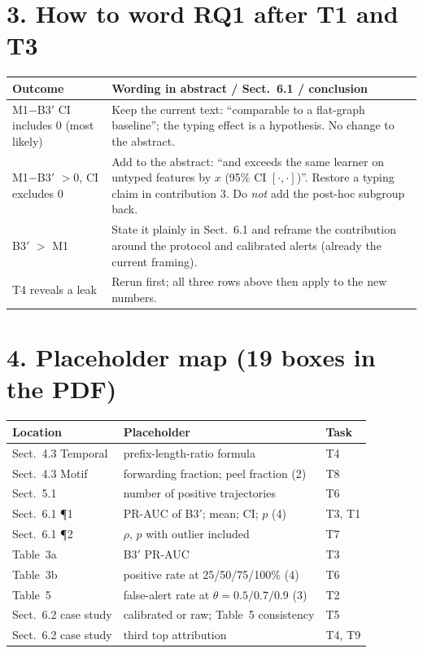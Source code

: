 \documentclass[11pt,a4paper]{article}
\begin{document}
\section*{3. How to word RQ1 after T1 and T3}
\begin{center}\small
\begin{tabular}{@{}p{6.2cm}p{9.6cm}@{}}
\toprule
Outcome & Wording in abstract / Sect.~6.1 / conclusion \\
\midrule
M1$-$B3$'$ CI includes 0 (most likely) & Keep the current text: ``comparable to a flat-graph baseline''; the typing effect is a hypothesis. No change to the abstract. \\
M1$-$B3$'$ $>0$, CI excludes 0 & Add to the abstract: ``and exceeds the same learner on untyped features by $x$ (95\% CI $[\cdot,\cdot]$)''. Restore a typing claim in contribution 3. Do \emph{not} add the post-hoc subgroup back. \\
B3$'$ $>$ M1 & State it plainly in Sect.~6.1 and reframe the contribution around the protocol and calibrated alerts (already the current framing). \\
T4 reveals a leak & Rerun first; all three rows above then apply to the new numbers. \\
\bottomrule
\end{tabular}
\end{center}

\section*{4. Placeholder map (19 boxes in the PDF)}
\begin{center}\small
\begin{tabular}{@{}lll@{}}
\toprule
Location & Placeholder & Task \\
\midrule
Sect.~4.3 Temporal & prefix-length-ratio formula & T4 \\
Sect.~4.3 Motif & forwarding fraction; peel fraction (2) & T8 \\
Sect.~5.1 & number of positive trajectories & T6 \\
Sect.~6.1 ¶1 & PR-AUC of B3$'$; mean; CI; $p$ (4) & T3, T1 \\
Sect.~6.1 ¶2 & $\rho$, $p$ with outlier included & T7 \\
Table~3a & B3$'$ PR-AUC & T3 \\
Table~3b & positive rate at 25/50/75/100\% (4) & T6 \\
Table~5 & false-alert rate at $\theta=0.5/0.7/0.9$ (3) & T2 \\
Sect.~6.2 case study & calibrated or raw; Table~5 consistency & T5 \\
Sect.~6.2 case study & third top attribution & T4, T9 \\
\bottomrule
\end{tabular}
\end{center}
\end{document}
